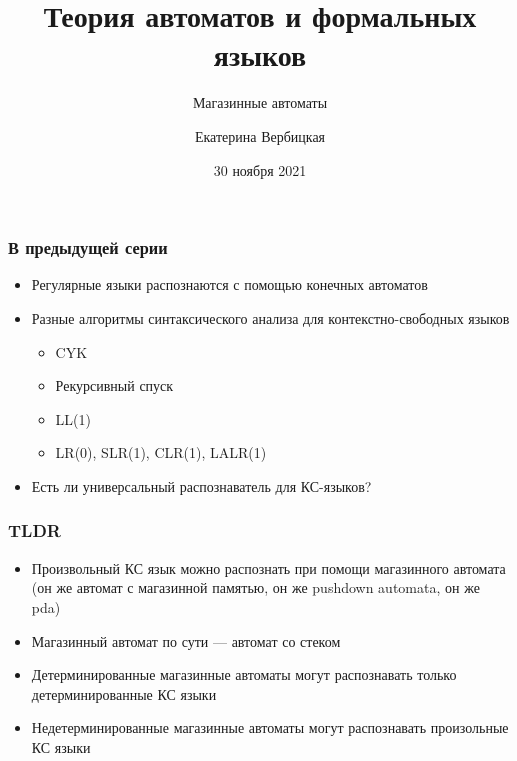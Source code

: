 \documentclass[dvipsnames]{beamer}
\title[]{Теория автоматов и формальных языков}
\subtitle[]{Магазинные автоматы}
\institute[]{
Санкт-Петербургский государственный электротехнический университет <<ЛЭТИ>>\\
}
\author[]{Екатерина Вербицкая}
\date{30 ноября 2021}
\begin{document}
{
  \begin{frame}
    \titlepage
  \end{frame}
}

\begin{frame}[fragile]
  \frametitle{В предыдущей серии}
  \begin{itemize}
    \item Регулярные языки распознаются с помощью конечных автоматов
    \item Разные алгоритмы синтаксического анализа для контекстно-свободных языков
    \begin{itemize}
    	\item CYK
    	\item Рекурсивный спуск
    	\item LL(1)
    	\item LR(0), SLR(1), CLR(1), LALR(1)
    \end{itemize}
    \item Есть ли универсальный распознаватель для КС-языков?
  \end{itemize}
\end{frame}

\begin{frame}[fragile]
  \frametitle{TLDR}
  \begin{itemize}
  	\item Произвольный КС язык можно распознать при помощи магазинного автомата (он же автомат с магазинной памятью, он же pushdown automata, он же pda)
  	\item Магазинный автомат по сути --- автомат со стеком
  	\item Детерминированные магазинные автоматы могут распознавать только детерминированные КС языки
  	\item Недетерминированные магазинные автоматы могут распознавать произольные КС языки
  \end{itemize}
\end{frame}
\end{document}
